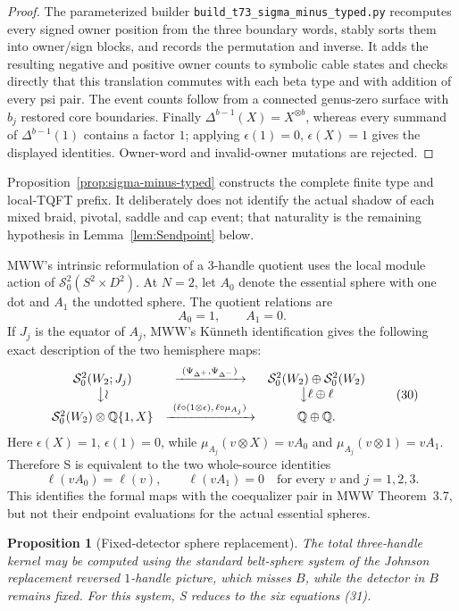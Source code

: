 \documentclass[11pt]{amsart}
\newtheorem{proposition}[theorem]{Proposition}
\theoremstyle{definition}
\theoremstyle{remark}
\newcommand{\Q}{\mathbb{Q}}
\begin{document}
\begin{proof}
The parameterized builder \texttt{build\_t73\_sigma\_minus\_typed.py}
recomputes every signed owner position from the three boundary words, stably
sorts them into owner/sign blocks, and records the permutation and inverse.
It adds the resulting negative and positive owner counts to symbolic cable
states and checks directly that this translation commutes with each beta type
and with addition of every psi pair.  The event counts follow from a connected
genus-zero surface with $b_j$ restored core boundaries.  Finally
$\Delta^{b-1}(X)=X^{\otimes b}$, whereas every summand of
$\Delta^{b-1}(1)$ contains a factor $1$; applying
$\epsilon(1)=0$, $\epsilon(X)=1$ gives the displayed identities.  Owner-word
and invalid-owner mutations are rejected.
\end{proof}

Proposition~\ref{prop:sigma-minus-typed} constructs the complete finite type
and local-TQFT prefix.  It deliberately does not identify the actual shadow of
each mixed braid, pivotal, saddle and cap event; that naturality is the
remaining hypothesis in Lemma~\ref{lem:Sendpoint} below.

MWW's intrinsic reformulation of a $3$-handle quotient uses the local module
action of $\mathcal S^2_0(S^2\times D^2)$.  At $N=2$, let $A_0$ denote the
essential sphere with one dot and $A_1$ the undotted sphere.  The quotient
relations are
\[
A_0=1,\qquad A_1=0.
\]
If $J_j$ is the equator of $A_j$, MWW's K\"unneth identification gives the
following exact description of the two hemisphere maps:
\[
\begin{array}{ccc}
\mathcal S^2_0(W_2;J_j)&\xrightarrow{\ (\Psi_{\Delta^+},\Psi_{\Delta^-})\ }&
\mathcal S^2_0(W_2)\oplus\mathcal S^2_0(W_2)\\
\big\downarrow\wr&&\big\downarrow{\ell\oplus\ell}\\
\mathcal S^2_0(W_2)\otimes\Q\{1,X\}
&\xrightarrow{\ (\ell\circ(1\otimes\epsilon),\,\ell\circ\mu_{A_j})\ }&
\Q\oplus\Q.
\end{array}
\tag{30}
\]
Here $\epsilon(X)=1$, $\epsilon(1)=0$, while
$\mu_{A_j}(v\otimes X)=vA_0$ and
$\mu_{A_j}(v\otimes1)=vA_1$.  Therefore S is equivalent to the two
whole-source identities
\[
\ell(vA_0)=\ell(v),\qquad \ell(vA_1)=0
\quad\text{for every }v\text{ and }j=1,2,3.
\tag{31}
\]
This identifies the formal maps with the coequalizer pair in MWW
Theorem~3.7, but not their endpoint evaluations for the actual essential
spheres.

\begin{proposition}[Fixed-detector sphere replacement]\label{thm:Sgeometry}
The total three-handle kernel may be computed using the standard belt-sphere
system of the Johnson replacement reversed $1$-handle picture, which misses
$B$, while the detector in $B$ remains fixed.  For this system, S reduces to
the six equations (31).
\end{proposition}
\end{document}
